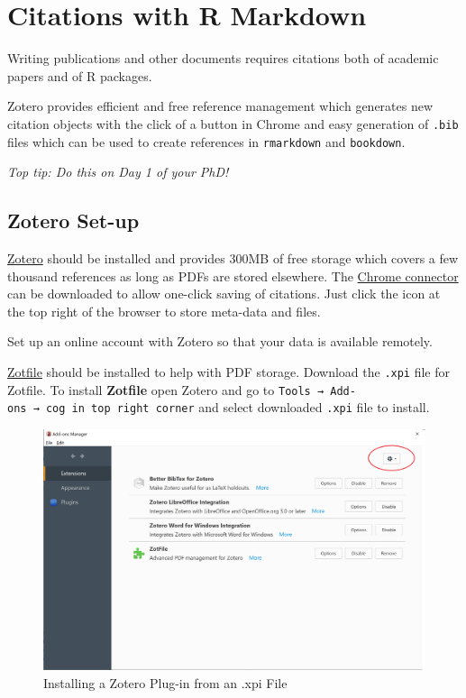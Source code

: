 \documentclass[
]{book}
\begin{document}
\hypertarget{citations-with-r-markdown}{%
\chapter{Citations with R Markdown}\label{citations-with-r-markdown}}

Writing publications and other documents requires citations both of academic papers and of R packages.

Zotero provides efficient and free reference management which generates new citation objects with the click of a button in Chrome and easy generation of \texttt{.bib} files which can be used to create references in \texttt{rmarkdown} and \texttt{bookdown}.

\emph{Top tip: Do this on Day 1 of your PhD!}

\hypertarget{zotero-set-up}{%
\section{Zotero Set-up}\label{zotero-set-up}}

\href{https://www.zotero.org/download/}{Zotero} should be installed and provides 300MB of free storage which covers a few thousand references as long as PDFs are stored elsewhere. The \href{https://www.zotero.org/download/}{Chrome connector} can be downloaded to allow one-click saving of citations. Just click the icon at the top right of the browser to store meta-data and files.

Set up an online account with Zotero so that your data is available remotely.

\href{https://www.zotero.org/support/plugins}{Zotfile} should be installed to help with PDF storage. Download the \texttt{.xpi} file for Zotfile. To install \textbf{Zotfile} open Zotero and go to \texttt{Tools\ →\ Add-ons\ →\ cog\ in\ top\ right\ corner} and select downloaded \texttt{.xpi} file to install.

\begin{figure}
\includegraphics[width=36.78in]{img/zotero_add_on_install} \caption{Installing a Zotero Plug-in from an .xpi File}\label{fig:add-on-install}
\end{figure}
\end{document}
